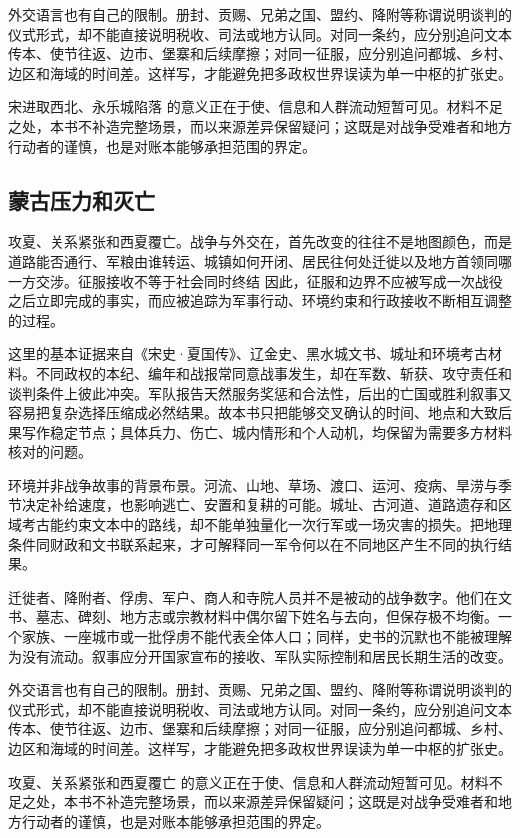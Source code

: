 外交语言也有自己的限制。册封、贡赐、兄弟之国、盟约、降附等称谓说明谈判的仪式形式，却不能直接说明税收、司法或地方认同。对同一条约，应分别追问文本传本、使节往返、边市、堡寨和后续摩擦；对同一征服，应分别追问都城、乡村、边区和海域的时间差。这样写，才能避免把多政权世界误读为单一中枢的扩张史。

宋进取西北、永乐城陷落 的意义正在于使、信息和人群流动短暂可见。材料不足之处，本书不补造完整场景，而以来源差异保留疑问；这既是对战争受难者和地方行动者的谨慎，也是对账本能够承担范围的界定。

\subsection{蒙古压力和灭亡}

攻夏、关系紧张和西夏覆亡。战争与外交在，首先改变的往往不是地图颜色，而是道路能否通行、军粮由谁转运、城镇如何开闭、居民往何处迁徙以及地方首领同哪一方交涉。征服接收不等于社会同时终结 因此，征服和边界不应被写成一次战役之后立即完成的事实，而应被追踪为军事行动、环境约束和行政接收不断相互调整的过程。

这里的基本证据来自《宋史·夏国传》、辽金史、黑水城文书、城址和环境考古材料。不同政权的本纪、编年和战报常同意战事发生，却在军数、斩获、攻守责任和谈判条件上彼此冲突。军队报告天然服务奖惩和合法性，后出的亡国或胜利叙事又容易把复杂选择压缩成必然结果。故本书只把能够交叉确认的时间、地点和大致后果写作稳定节点；具体兵力、伤亡、城内情形和个人动机，均保留为需要多方材料核对的问题。

环境并非战争故事的背景布景。河流、山地、草场、渡口、运河、疫病、旱涝与季节决定补给速度，也影响逃亡、安置和复耕的可能。城址、古河道、道路遗存和区域考古能约束文本中的路线，却不能单独量化一次行军或一场灾害的损失。把地理条件同财政和文书联系起来，才可解释同一军令何以在不同地区产生不同的执行结果。

迁徙者、降附者、俘虏、军户、商人和寺院人员并不是被动的战争数字。他们在文书、墓志、碑刻、地方志或宗教材料中偶尔留下姓名与去向，但保存极不均衡。一个家族、一座城市或一批俘虏不能代表全体人口；同样，史书的沉默也不能被理解为没有流动。叙事应分开国家宣布的接收、军队实际控制和居民长期生活的改变。

外交语言也有自己的限制。册封、贡赐、兄弟之国、盟约、降附等称谓说明谈判的仪式形式，却不能直接说明税收、司法或地方认同。对同一条约，应分别追问文本传本、使节往返、边市、堡寨和后续摩擦；对同一征服，应分别追问都城、乡村、边区和海域的时间差。这样写，才能避免把多政权世界误读为单一中枢的扩张史。

攻夏、关系紧张和西夏覆亡 的意义正在于使、信息和人群流动短暂可见。材料不足之处，本书不补造完整场景，而以来源差异保留疑问；这既是对战争受难者和地方行动者的谨慎，也是对账本能够承担范围的界定。


